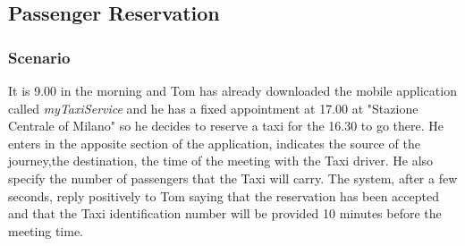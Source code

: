 \pagebreak
\subsection{Passenger Reservation}
\subsubsection{Scenario}
It is 9.00 in the morning and Tom has already downloaded the mobile application called \textit{myTaxiService} and he has a fixed appointment at 17.00 at "Stazione Centrale of Milano" so he decides to reserve a taxi for the 16.30 to go there. He enters in the apposite section of the application, indicates the source of the journey,the destination, the time of the meeting with the Taxi driver. He also specify the number of passengers that the Taxi will carry. The system, after a few seconds, reply positively to Tom saying that the reservation has been accepted and that the Taxi identification number will be provided 10 minutes before the meeting time.

